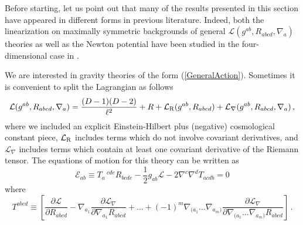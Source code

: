 \documentclass[11pt]{article}
\newcommand{\diff}{\mathrm{d}}
\begin{document}
 Before starting, let us point out that many of the results presented in this section have appeared in different forms in previous literature. Indeed, both the linearization on maximally symmetric backgrounds of general $\mathcal{L}(g^{ab},R_{abcd},\nabla_a)$ theories as well as the Newton potential have been studied in the four-dimensional case in \cite{Biswas:2013kla,Conroy:2014eja,Biswas:2016etb,Edholm:2018wjh,Biswas:2016egy,Dengiz:2020xbu, Kolar:2023mkw}. 

We are interested in gravity theories of the form (\ref{GeneralAction}).
Sometimes it is convenient to split the Lagrangian as follows
\begin{equation}
 \mathcal{L}( g^{ab},R_{abcd},\nabla_a)=\frac{(D-1)(D-2)}{\ell^2}+R+ \mathcal{L}_{\rm R}( g^{ab},R_{abcd})+ \mathcal{L}_{\nabla}( g^{ab},R_{abcd},\nabla_a)\, ,
\end{equation}
where we included an explicit Einstein-Hilbert plus (negative) cosmological constant piece, $\mathcal{L}_{\rm R}$ includes terms which do not involve covariant derivatives, and $\mathcal{L}_{\nabla}$ includes terms which contain at least one covariant derivative of the Riemann tensor. 
%
The equations of motion for this theory can be written as \cite{Iyer:1994ys}
\begin{equation}
\mathcal{E}_{ab}\equiv T_{a}\,^{cde}R_{b cde}-\frac{1}{2}g_{ab}\mathcal{L}-2 \nabla^c\nabla^d T_{a c d b}=0
\end{equation}
where
\begin{equation}
T^{abcd}\equiv \left[ \frac{\partial \mathcal{L}}{\partial R_{abcd}} - \nabla_{a_1} \frac{\partial \mathcal{L}_{\nabla}}{\partial \nabla_{a_1} R_{abcd}}+\dots+ (-1)^m \nabla_{(a_1}\dots \nabla_{a_m)}\frac{\partial \mathcal{L}_{\nabla}}{\partial  \nabla_{(a_1}\dots \nabla_{a_m)}R_{abcd}} \right]\, .
\end{equation}
\end{document}
